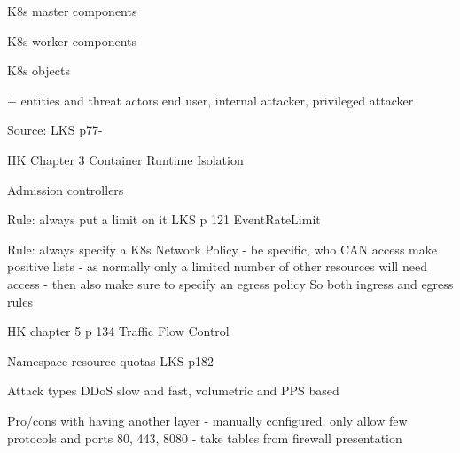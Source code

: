 \documentclass[Screen16to9,17pt]{foils}
\begin{document}

\begin{list2}
\item K8s master components
\item K8s worker components
\item K8s objects
\end{list2}

+ entities and threat actors end user, internal attacker, privileged attacker

Source: LKS p77-





\begin{list2}
\item HK Chapter 3 Container Runtime Isolation
\end{list2}



\begin{list2}
\item Admission controllers
\end{list2}

Rule: always put a limit on it
LKS p 121 EventRateLimit


Rule: always specify a K8s Network Policy - be specific, who CAN access
make positive lists - as normally only a limited number of other resources will need access
- then also make sure to specify an egress policy
So both ingress and egress rules

HK chapter 5 p 134 Traffic Flow Control


Namespace resource quotas LKS p182


\begin{list2}
\item Attack types DDoS slow and fast, volumetric and PPS based
\item Pro/cons with having another layer - manually configured, only allow few protocols and ports 80, 443, 8080
- take tables from firewall presentation
\end{list2}




\begin{list2}
\item
\end{list2}
\end{document}
